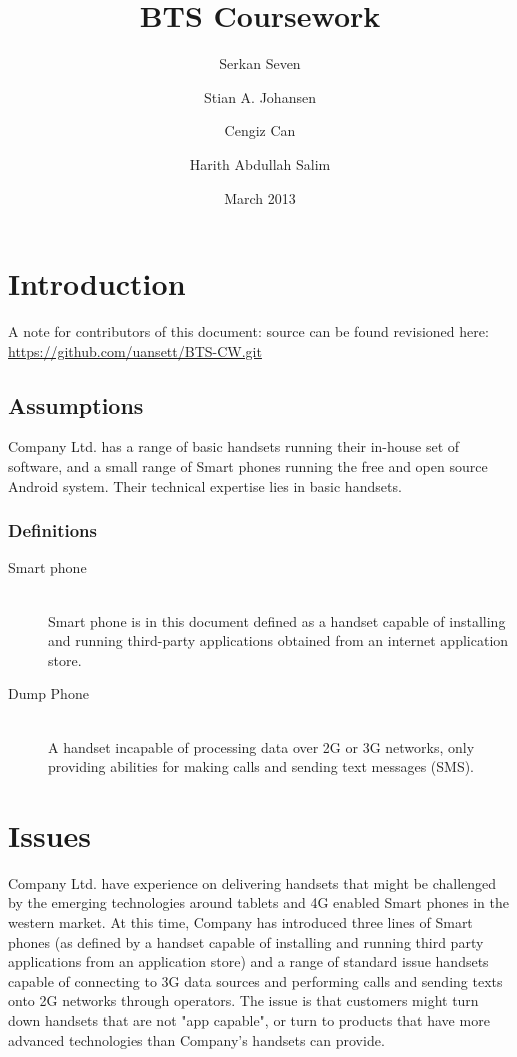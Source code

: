 \documentclass{article}
\title{BTS Coursework}
\date{March 2013}
\author{Serkan Seven \and Stian A. Johansen \and Cengiz Can \and Harith Abdullah Salim}
\begin{document}
\maketitle
\section{Introduction} %
\label{sec:Introduction}
A note for contributors of this document: source can be found revisioned here: \url{https://github.com/uansett/BTS-CW.git}
\subsection{Assumptions} %
\label{sub:Assumptions}

Company Ltd. has a range of basic handsets running their in-house set of software, and a small range of Smart phones running the free and open source Android system. Their technical expertise lies in basic handsets.

\subsubsection{Definitions} %
\label{ssub:Definitions}

\begin{description}
  \item[Smart phone] \hfill \\ 
  Smart phone is in this document defined as a handset capable of installing and running third-party applications obtained from an internet application store.
  \item[Dump Phone] \hfill \\ 
  A handset incapable of processing data over 2G or 3G networks, only providing abilities for making calls and sending text messages (SMS).
\end{description}
\section{Issues} %
\label{sec:Issues}
Company Ltd. have experience on delivering handsets that might be challenged by the emerging technologies around tablets and 4G enabled Smart phones in the western market.
At this time, Company has introduced three lines of Smart phones (as defined by a handset capable of installing and running third party applications from an application store) and a range of standard issue handsets capable of connecting to 3G data sources and performing calls and sending texts onto 2G networks through operators. The issue is that customers might turn down handsets that are not "app capable", or turn to products that have more advanced technologies than Company's handsets can provide.
\end{document}
